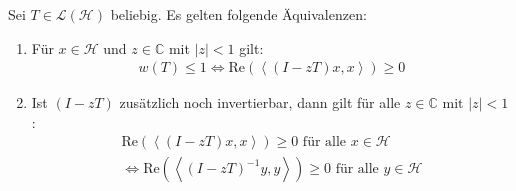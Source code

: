 \begin{lem} \label{lem:hlem_power_ineq}
	Sei $T \in \mathcal{L(H)}$ beliebig. Es gelten folgende Äquivalenzen: \begin{enumerate}[label=(\roman*)]
		\item Für $x \in \mathcal{H}$ und  $z \in \mathbb{C}$ mit $|z| < 1$ gilt: 
		\begin{align}
			w(T) \le 1 \iff \mathrm{Re}( \left< (I - zT)x,x \right> ) \ge 0 
		\end{align}
		\item Ist $(I - zT)$ zusätzlich noch invertierbar, dann gilt für alle $z \in \mathbb{C} \text{ mit } |z| < 1$:
		\begin{align}
			\mathrm{Re}( \left< (I - zT)x,x \right> ) \ge 0 \text{ für alle } x \in \mathcal{H} \nonumber \\
			\iff \mathrm{Re}( \left< (I - zT)^{-1}y,y \right> ) \ge 0 \text{ für alle } y  \in \mathcal{H}
		\end{align}
	\end{enumerate}
\end{lem}
